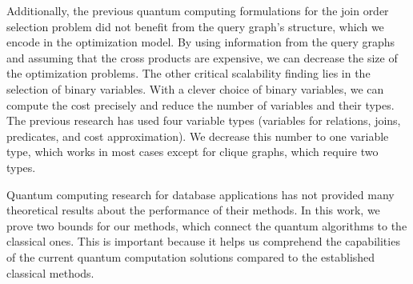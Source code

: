 Additionally, the previous quantum computing formulations for the join order selection problem did not benefit from the query graph's structure, which we encode in the optimization model. By using information from the query graphs and assuming that the cross products are expensive, we can decrease the size of the optimization problems. The other critical scalability finding lies in the selection of binary variables. With a clever choice of binary variables, we can compute the cost precisely and reduce the number of variables and their types. The previous research \cite{Schonberger_Scherzinger_Mauerer, 10.14778/3632093.3632112} has used four variable types (variables for relations, joins, predicates, and cost approximation). We decrease this number to one variable type, which works in most cases except for clique graphs, which require two types.

Quantum computing research for database applications has not provided many theoretical results about the performance of their methods. In this work, we prove two bounds for our methods, which connect the quantum algorithms to the classical ones. This is important because it helps us comprehend the capabilities of the current quantum computation solutions compared to the established classical methods.


